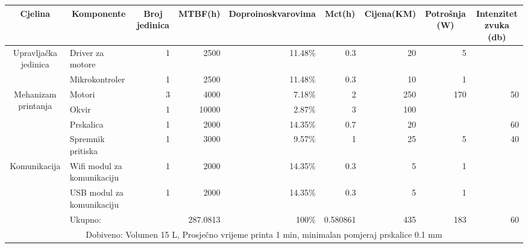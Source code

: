 \documentclass[12pt]{article}
\begin{document}
\begin{landscape}
\begin{table}[]
\begin{tabular}{ccccccccc}
    \midrule
    Cjelina & Komponente & Broj jedinica & MTBF(h) & \multicolumn{1}{p{5.215em}}{Doproinos\newline{}kvarovima} & Mct(h) & Cijena(KM) & Potrošnja (W) & Intenzitet zvuka (db) \\
    \midrule
    \multirow{2}[4]{*}{Upravljačka jedinica} & \multicolumn{1}{l}{Driver za motore} & \multicolumn{1}{r}{1} & \multicolumn{1}{r}{2500} & \multicolumn{1}{r}{11.48\%} & \multicolumn{1}{r}{0.3} & \multicolumn{1}{r}{20} & \multicolumn{1}{r}{5} &  \\
\cmidrule{5-5}          & \multicolumn{1}{l}{Mikrokontroler} & \multicolumn{1}{r}{1} & \multicolumn{1}{r}{2500} & \multicolumn{1}{r}{11.48\%} & \multicolumn{1}{r}{0.3} & \multicolumn{1}{r}{10} & \multicolumn{1}{r}{1} &  \\
    \midrule
    \multirow{4}[8]{*}{Mehanizam printanja} & \multicolumn{1}{l}{Motori} & \multicolumn{1}{r}{3} & \multicolumn{1}{r}{4000} & \multicolumn{1}{r}{7.18\%} & \multicolumn{1}{r}{2} & \multicolumn{1}{r}{250} & \multicolumn{1}{r}{170} & \multicolumn{1}{r}{50} \\
\cmidrule{5-5}          & \multicolumn{1}{l}{Okvir} & \multicolumn{1}{r}{1} & \multicolumn{1}{r}{10000} & \multicolumn{1}{r}{2.87\%} & \multicolumn{1}{r}{3} & \multicolumn{1}{r}{100} &       &  \\
\cmidrule{5-5}          & \multicolumn{1}{l}{Prskalica} & \multicolumn{1}{r}{1} & \multicolumn{1}{r}{2000} & \multicolumn{1}{r}{14.35\%} & \multicolumn{1}{r}{0.7} & \multicolumn{1}{r}{20} &       & \multicolumn{1}{r}{60} \\
\cmidrule{5-5}          & \multicolumn{1}{l}{Spremnik pritiska} & \multicolumn{1}{r}{1} & \multicolumn{1}{r}{3000} & \multicolumn{1}{r}{9.57\%} & \multicolumn{1}{r}{1} & \multicolumn{1}{r}{25} & \multicolumn{1}{r}{5} & \multicolumn{1}{r}{40} \\
    \midrule
    \multirow{2}[4]{*}{Komunikacija} & \multicolumn{1}{l}{Wifi modul za komunikaciju} & \multicolumn{1}{r}{1} & \multicolumn{1}{r}{2000} & \multicolumn{1}{r}{14.35\%} & \multicolumn{1}{r}{0.3} & \multicolumn{1}{r}{5} & \multicolumn{1}{r}{1} &  \\
\cmidrule{5-5}          & \multicolumn{1}{l}{USB modul za komunikaciju} & \multicolumn{1}{r}{1} & \multicolumn{1}{r}{2000} & \multicolumn{1}{r}{14.35\%} & \multicolumn{1}{r}{0.3} & \multicolumn{1}{r}{5} & \multicolumn{1}{r}{1} &  \\
    \midrule
          & \multicolumn{1}{l}{Ukupno:} &       & \multicolumn{1}{r}{287.0813} & \multicolumn{1}{r}{100\%} & \multicolumn{1}{r}{0.580861} & \multicolumn{1}{r}{435} & \multicolumn{1}{r}{183} & \multicolumn{1}{r}{60} \\
    \midrule
    \multicolumn{9}{c}{Dobiveno: Volumen 15 L, Prosječno vrijeme printa 1 min, minimalan pomjeraj prskalice 0.1 mm} \\
    \bottomrule
    \end{tabular}%
  \label{tab:addlabel}%
\end{table}%


\end{landscape}
\end{document}
